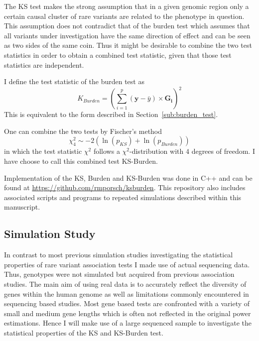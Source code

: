 The KS test makes the strong assumption that in a given genomic region only a certain causal cluster of rare variants are related to the phenotype in question.
This assumption does not contradict that of the burden test which assumes that all variants under investigation have the same direction of effect and can be seen as two sides of the same coin.
Thus it might be desirable to combine the two test statistics in order to obtain a combined test statistic, given that those test statistics are independent.

I define the test statistic of the burden test as 
\begin{equation}\label{eq:burden_simple}
  K_{Burden} = (\sum^p_{i=1} (\pmb{y}-\bar{y}) \times \pmb{G_i})^2
\end{equation}
This is equivalent to the form described in Section~\ref{sub:burden_test}.

One can combine the two tests by Fischer's method 
\begin{equation}
	\chi^2_4 \sim - 2 (\ln(p_{KS}) + \ln(p_{Burden}))
\end{equation}
in which the test statistic $\chi^2$ follows a $\chi^2$-distribution with $4$ degrees of freedom.
I have choose to call this combined test KS-Burden.

Implementation of the KS, Burden and KS-Burden was done in C++ and can be found at \url{https://github.com/rmporsch/ksburden}.
This repository also includes associated scripts and programs to repeated simulations described within this manuscript.

\subsection{Simulation Study}
\label{sub:simulation_study}

In contrast to most previous simulation studies investigating the statistical properties of rare variant association tests I made use of actual sequencing data.
Thus, genotypes were not simulated but acquired from previous association studies.
The main aim of using real data is to accurately reflect the diversity of genes within the human genome as well as limitations commonly encountered in sequencing based studies.
Most gene based tests are confronted with a variety of small and medium gene lengths which is often not reflected in the original power estimations.
Hence I will make use of a large sequenced sample to investigate the statistical properties of the KS and KS-Burden test.

